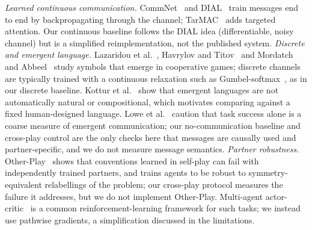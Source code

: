 \emph{Learned continuous communication.} CommNet~\cite{sukhbaatar2016learning} and DIAL~\cite{foerster2016learning} train messages end to end by backpropagating through the channel; TarMAC~\cite{das2018tarmac} adds targeted attention. Our continuous baseline follows the DIAL idea (differentiable, noisy channel) but is a simplified reimplementation, not the published system. \emph{Discrete and emergent language.} Lazaridou et al.~\cite{lazaridou2016multi}, Havrylov and Titov~\cite{havrylov2017emergence} and Mordatch and Abbeel~\cite{mordatch2017emergence} study symbols that emerge in cooperative games; discrete channels are typically trained with a continuous relaxation such as Gumbel-softmax~\cite{jang2016categorical}, as in our discrete baseline. Kottur et al.~\cite{kottur2017natural} show that emergent languages are not automatically natural or compositional, which motivates comparing against a fixed human-designed language. Lowe et al.~\cite{lowe2019pitfalls} caution that task success alone is a coarse measure of emergent communication; our no-communication baseline and cross-play control are the only checks here that messages are causally used and partner-specific, and we do not measure message semantics. \emph{Partner robustness.} Other-Play~\cite{hu2020other} shows that conventions learned in self-play can fail with independently trained partners, and trains agents to be robust to symmetry-equivalent relabellings of the problem; our cross-play protocol measures the failure it addresses, but we do not implement Other-Play. Multi-agent actor-critic~\cite{lowe2017multi} is a common reinforcement-learning framework for such tasks; we instead use pathwise gradients, a simplification discussed in the limitations.
